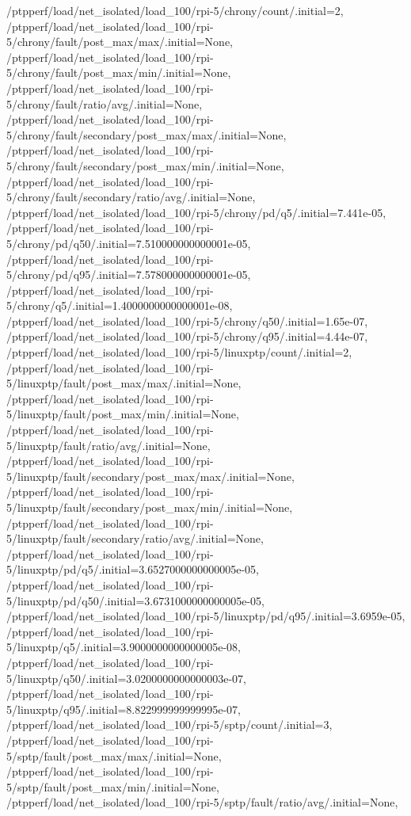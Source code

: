 {    /ptpperf/load/net_isolated/load_100/rpi-5/chrony/count/.initial=2,
    /ptpperf/load/net_isolated/load_100/rpi-5/chrony/fault/post_max/max/.initial=None,
    /ptpperf/load/net_isolated/load_100/rpi-5/chrony/fault/post_max/min/.initial=None,
    /ptpperf/load/net_isolated/load_100/rpi-5/chrony/fault/ratio/avg/.initial=None,
    /ptpperf/load/net_isolated/load_100/rpi-5/chrony/fault/secondary/post_max/max/.initial=None,
    /ptpperf/load/net_isolated/load_100/rpi-5/chrony/fault/secondary/post_max/min/.initial=None,
    /ptpperf/load/net_isolated/load_100/rpi-5/chrony/fault/secondary/ratio/avg/.initial=None,
    /ptpperf/load/net_isolated/load_100/rpi-5/chrony/pd/q5/.initial=7.441e-05,
    /ptpperf/load/net_isolated/load_100/rpi-5/chrony/pd/q50/.initial=7.510000000000001e-05,
    /ptpperf/load/net_isolated/load_100/rpi-5/chrony/pd/q95/.initial=7.578000000000001e-05,
    /ptpperf/load/net_isolated/load_100/rpi-5/chrony/q5/.initial=1.4000000000000001e-08,
    /ptpperf/load/net_isolated/load_100/rpi-5/chrony/q50/.initial=1.65e-07,
    /ptpperf/load/net_isolated/load_100/rpi-5/chrony/q95/.initial=4.44e-07,
    /ptpperf/load/net_isolated/load_100/rpi-5/linuxptp/count/.initial=2,
    /ptpperf/load/net_isolated/load_100/rpi-5/linuxptp/fault/post_max/max/.initial=None,
    /ptpperf/load/net_isolated/load_100/rpi-5/linuxptp/fault/post_max/min/.initial=None,
    /ptpperf/load/net_isolated/load_100/rpi-5/linuxptp/fault/ratio/avg/.initial=None,
    /ptpperf/load/net_isolated/load_100/rpi-5/linuxptp/fault/secondary/post_max/max/.initial=None,
    /ptpperf/load/net_isolated/load_100/rpi-5/linuxptp/fault/secondary/post_max/min/.initial=None,
    /ptpperf/load/net_isolated/load_100/rpi-5/linuxptp/fault/secondary/ratio/avg/.initial=None,
    /ptpperf/load/net_isolated/load_100/rpi-5/linuxptp/pd/q5/.initial=3.6527000000000005e-05,
    /ptpperf/load/net_isolated/load_100/rpi-5/linuxptp/pd/q50/.initial=3.6731000000000005e-05,
    /ptpperf/load/net_isolated/load_100/rpi-5/linuxptp/pd/q95/.initial=3.6959e-05,
    /ptpperf/load/net_isolated/load_100/rpi-5/linuxptp/q5/.initial=3.9000000000000005e-08,
    /ptpperf/load/net_isolated/load_100/rpi-5/linuxptp/q50/.initial=3.0200000000000003e-07,
    /ptpperf/load/net_isolated/load_100/rpi-5/linuxptp/q95/.initial=8.822999999999995e-07,
    /ptpperf/load/net_isolated/load_100/rpi-5/sptp/count/.initial=3,
    /ptpperf/load/net_isolated/load_100/rpi-5/sptp/fault/post_max/max/.initial=None,
    /ptpperf/load/net_isolated/load_100/rpi-5/sptp/fault/post_max/min/.initial=None,
    /ptpperf/load/net_isolated/load_100/rpi-5/sptp/fault/ratio/avg/.initial=None,
}
